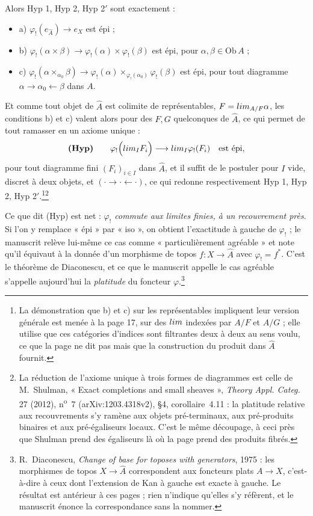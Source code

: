 \documentclass[11pt,a4paper]{article}
\begin{document}
Alors Hyp 1, Hyp 2, Hyp 2${}'$ sont exactement :
\begin{itemize}
\item a) $\varphi_{!}(e_{\widehat{A}}) \to e_{X}$ est épi ;
\item b) $\varphi_{!}(\alpha\times\beta) \to \varphi_{!}(\alpha) \times
\varphi_{!}(\beta)$ est épi, pour $\alpha,\beta \in \mathrm{Ob}\,A$ ;
\item c) $\varphi_{!}(\alpha\times_{\alpha_{0}}\beta) \to \varphi_{!}(\alpha)
\times_{\varphi_{!}(\alpha_{0})} \varphi_{!}(\beta)$ est épi, pour tout
diagramme $\alpha \to \alpha_{0} \leftarrow \beta$ dans $A$.
\end{itemize}
Et comme tout objet de $\widehat{A}$ est colimite de représentables,
$F = \varinjlim_{A/F}\alpha$, les conditions b) et c) valent alors pour des
$F, G$ quelconques de $\widehat{A}$, ce qui permet de tout ramasser en un
axiome unique :
\[
  \textbf{(Hyp)} \qquad
  \varphi_{!}\Bigl(\varprojlim_{I} F_{i}\Bigr) \longrightarrow
  \varprojlim_{I} \varphi_{!}(F_{i}) \quad \text{est épi},
\]
pour tout diagramme fini $(F_{i})_{i \in I}$ dans $\widehat{A}$, et il suffit
de le postuler pour $I$ vide, discret à deux objets, et
$({\cdot} \to {\cdot} \leftarrow {\cdot})$, ce qui redonne respectivement
Hyp 1, Hyp 2, Hyp 2${}'$.\footnote{La démonstration que b) et c) sur les
représentables impliquent leur version générale est menée à la page 17, sur des
$\varinjlim$ indexées par $A/F$ et $A/G$ ; elle utilise que ces catégories
d'indices sont filtrantes deux à deux au sens voulu, ce que la page ne dit pas
mais que la construction du produit dans $\widehat{A}$ fournit.}\footnote{La
réduction de l'axiome unique à trois formes de diagrammes est celle de
M.~Shulman, « Exact completions and small sheaves », \emph{Theory Appl. Categ.}
27 (2012), n\textsuperscript{o}~7 (arXiv:1203.4318v2), §4, corollaire~4.11 :
la platitude relative aux recouvrements s'y ramène aux objets pré-terminaux, aux
pré-produits binaires et aux pré-égaliseurs locaux. C'est le même découpage,
à ceci près que Shulman prend des égaliseurs là où la page prend des produits
fibrés.}

Ce que dit (Hyp) est net : \emph{$\varphi_{!}$ commute aux limites finies, à
un recouvrement près}. Si l'on y remplace « épi » par « iso », on obtient
l'exactitude à gauche de $\varphi_{!}$ ; le manuscrit relève lui-même ce cas
comme « particulièrement agréable » et note qu'il équivaut à la donnée d'un
morphisme de topos $f \colon X \to \widehat{A}$ avec $\varphi_{!} = f^{*}$.
C'est le théorème de Diaconescu, et ce que le manuscrit appelle le cas agréable
s'appelle aujourd'hui la \emph{platitude} du foncteur
$\varphi$.\footnote{R.~Diaconescu, \emph{Change of base for toposes with
generators}, 1975 : les morphismes de topos $X \to \widehat{A}$ correspondent
aux foncteurs plats $A \to X$, c'est-à-dire à ceux dont l'extension de Kan à
gauche est exacte à gauche. Le résultat est antérieur à ces pages ; rien
n'indique qu'elles s'y réfèrent, et le manuscrit énonce la correspondance sans
la nommer.}
\end{document}
